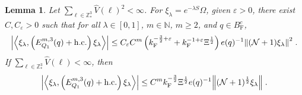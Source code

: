 \documentclass[12pt,a4paper]{article}
\numberwithin{equation}{section}
\newcommand{\NNN}{\mathbb{N}}
\newcommand{\1}{\mathbb{I}}
\newcommand{\F}{\mathrm{F}}
\newcommand{\Z}{\mathbb{Z}}
\newcommand{\NN}{\mathcal{N}}
\newcommand{\half}{\frac{1}{2}}
\newcommand{\eva}[1]{\left\langle #1 \right\rangle}
\theoremstyle{plain}
\newtheorem{lemma}[theorem]{Lemma}
\theoremstyle{definition}
\theoremstyle{remark}
\theoremstyle{plain}
\theoremstyle{definition}
\theoremstyle{remark}
\begin{document}
\begin{lemma} \label{lem:EQ112}
Let $ \sum_{\ell \in \Z^3_*} \hat{V}(\ell)^2 < \infty $. For $\xi_\lambda = e^{-\lambda S} \Omega$, given $ \varepsilon > 0 $, there exist $ C, C_\varepsilon > 0 $ such that for all $ \lambda \in [0,1] $, $ m \in \NNN $, $ m \ge 2 $, and $ q \in B_{\F}^c $,
\begin{align} \label{eq:estEQ112_Coulomb}
	\abs{\eva{\xi_\lambda,\left(E^{m,3}_{Q_1}(q) + \mathrm{h.c.}\right) \xi_\lambda }}
	\leq C_\varepsilon C^m \left( k_{\F}^{-\frac 32 + \varepsilon}
		+ k_{\F}^{-1 + \varepsilon} \Xi^\half \right)
		e(q)^{-1}
		\norm{(\NN+1) \xi_\lambda }^2 \;.
\end{align}
If $ \sum_{\ell \in \Z^3_*} \hat{V}(\ell) < \infty $, then
\begin{align} \label{eq:estEQ112}
	\abs{\eva{\xi_\lambda,\left(E^{m,3}_{Q_1}(q) + \mathrm{h.c.}\right) \xi_\lambda }}
	\leq C^m k_{\F}^{-\frac{3}{2}} \Xi^{\half} e(q)^{-1}
		\norm{(\NN+1)^\half \xi_\lambda } \;.
\end{align}
\end{lemma}
\end{document}
